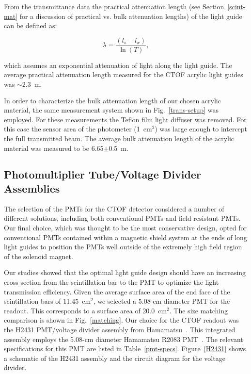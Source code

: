 \documentclass{elsart}
\begin{document}
From the transmittance data the practical attenuation length (see Section~\ref{scint-mat} 
for a discussion of practical vs. bulk attenuation lengths) of the light guide can be defined as:

\begin{equation}
\label{pracat}
\lambda= \frac{(l_s-l_x)}{\ln(T)},
\end{equation}

\noindent
which assumes an exponential attenuation of light along the light guide. The average practical 
attenuation length measured for the CTOF acrylic light guides was $\sim$2.3~m.

In order to characterize the bulk attenuation length of our chosen acrylic material, the same
measurement system shown in Fig.~\ref{trans-setup} was employed. For these measurements 
the Teflon film light diffuser was removed. For this case the sensor area of the photometer 
(1~cm$^2$) was large enough to intercept the full transmitted beam. The average bulk
attenuation length of the acrylic material was measured to be 6.65$\pm$0.5~m.

\subsection{Photomultiplier Tube/Voltage Divider Assemblies} 
\label{PMTs}

The selection of the PMTs for the CTOF detector considered a number of different solutions,
including both conventional PMTs and field-resistant PMTs. Our final choice, which was 
thought to be the most conservative design, opted for conventional PMTs contained within a
magnetic shield system at the ends of long light guides to position the PMTs well outside of
the extremely high field region of the solenoid magnet.

Our studies showed that the optimal light guide design should have an increasing cross
section from the scintillation bar to the PMT to optimize the light transmission efficiency.
Given the average surface area of the end face of the scintillation bars of 11.45~cm$^2$, we 
selected a 5.08-cm diameter PMT for the readout. This corresponds to a surface area of 
20.0~cm$^2$. The size matching comparison is shown in Fig.~\ref{matching}. Our choice for the 
CTOF readout was the H2431 PMT/voltage divider assembly from Hamamatsu~\cite{ham-ref}.
This integrated assembly employs the 5.08-cm diameter Hamamatsu R2083 PMT~\cite{r2083-ref}.
The relevant specifications for this PMT are listed in Table~\ref{pmt-specs}. Figure~\ref{H2431}
shows a schematic of the H2431 assembly and the circuit diagram for the voltage divider.
\end{document}
